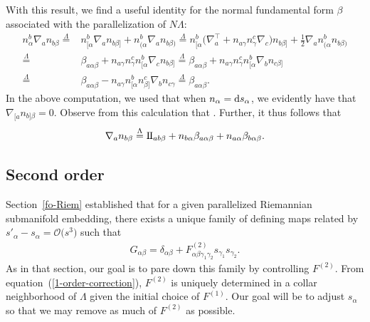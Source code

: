 \documentclass[pdftex]{sigma}
\numberwithin{equation}{section}
\newcommand{\II}{{\rm I\hspace{-.2mm}I}}
\renewcommand{\=}{\stackrel \Lambda =}
\begin{document}
With this result, we find a useful identity for the normal fundamental form $\beta$ associated with the parallelization of $N \Lambda$:
\begin{align}
n^b_{\alpha} \nabla_a n_{b \beta} \={}& n^b_{[\alpha} \nabla_a n_{b \beta]} + n^b_{(\alpha} \nabla_a n_{b \beta)}
\= n^b_{[\alpha} \bigl(\nabla_a^\top + n_{a \gamma} n^c_{\gamma} \nabla_c \bigr) n_{b \beta]} + \frac{1}{2} \nabla_a n^b_{(\alpha} n_{b \beta)} \nonumber \\
\={}& \beta_{a \alpha \beta} + n_{a \gamma} n^c_{\gamma} n^b_{[\alpha} \nabla_c n_{b \beta]}
\= \beta_{a \alpha \beta} + n_{a \gamma} n^c_{\gamma} n^b_{[\alpha} \nabla_b n_{c \beta]} \nonumber \\
\={}& \beta_{a \alpha \beta} - n_{a \gamma} n^b_{[\alpha} n^c_{\beta]} \nabla_b n_{c \gamma}
\= \beta_{a \alpha \beta} . \label{ndn-Riem}
\end{align}
In the above computation, we used that when $n_{\alpha} = {\rm d} s_{\alpha}$, we evidently have that $\nabla_{[a} n_{b]\beta} = 0$. Observe from this calculation that \smash{$[n_{\alpha},n_{\beta}]^a \= 2 \beta^a_{\alpha \beta}$}. Further, it thus follows that
\begin{align} \label{nabla-n}
\nabla_a n_{b \beta} \= \II_{ab \beta} + n_{b \alpha} \beta_{a \alpha \beta} + n_{a \alpha} \beta_{b \alpha \beta} .
\end{align}


\subsection{Second order} %
Section~\ref{fo-Riem} established that for a given parallelized Riemannian submanifold embedding, there exists a unique family of defining maps related by $s'_{\alpha} - s_{\alpha} = \mathcal{O}\bigl(s^3\bigr)$ such that
\begin{align} \label{1-order}
G_{\alpha \beta} = \delta_{\alpha \beta} + F^{(2)}_{\alpha \beta \gamma_1 \gamma_2} s_{\gamma_1} s_{\gamma_2} .
\end{align}
As in that section, our goal is to pare down this family by controlling $F^{(2)}$. From equation~(\ref{1-order-correction}), $F^{(2)}$ is uniquely determined in a collar neighborhood of $\Lambda$ given the initial choice of $F^{(1)}$. Our goal will be to adjust $s_{\alpha}$ so that we may remove as much of $F^{(2)}$ as possible.
\end{document}
